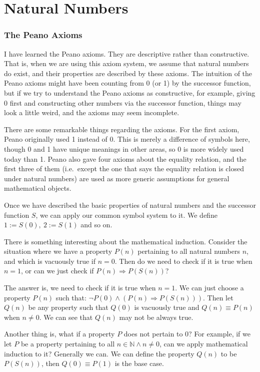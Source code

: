 
\part{Natural Numbers}
\section{The Peano Axioms}
I have learned the Peano axioms. They are descriptive rather than constructive. That is, when we are 
using this axiom system, we assume that natural numbers do exist, and their properties are described by 
these axioms. The intuition of the Peano axioms might have been counting from 0 (or 1) by the successor 
function, but if we try to understand the Peano axioms as constructive, for example, giving 0 first and 
constructing other numbers via the successor function, things may look a little weird, and the axioms 
may seem incomplete.

There are some remarkable things regarding the axioms. For the first axiom, Peano originally used 1 
instead of 0. This is merely a difference of symbols here, though 0 and 1 have unique meanings in other 
areas, so 0 is more widely used today than 1. Peano also gave four axioms about the equality relation, 
and the first three of them (i.e.~except the one that says the equality relation is closed under 
natural numbers) are used as more generic assumptions for general mathematical objects.

Once we have described the basic properties of natural numbers and the successor function $S$, we can 
apply our common symbol system to it. We define $1 := S(0),\ 2 :=S(1)$ and so on.

There is something interesting about the mathematical induction. Consider the situation where we have a 
property $P(n)$ pertaining to all natural numbers $n$, and which is vacuously true if $n=0$. Then do we 
need to check if it is true when $n=1$, or can we just check if $P(n) \Longrightarrow P(S(n))$? 

The answer is, we need to check if it is true when $n=1$. We can just choose a property $P(n)$ such that:
$\neg P(0) \wedge (P(n) \Longrightarrow P(S(n)))$. Then let $Q(n)$ be any property such that $Q(0)$ is 
vacuously true and $Q(n) \equiv P(n)$ when $n \neq 0$. We can see that $Q(n)$ may not be always true.

Another thing is, what if a property $P$ does not pertain to $0$? For example, if we let $P$ be a property 
pertaining to all $n \in \mathbb{N} \wedge n \neq 0$, can we apply mathematical induction to it? Generally 
we can. We can define the property $Q(n)$ to be $P(S(n))$, then $Q(0) \equiv P(1)$ is the base case.


